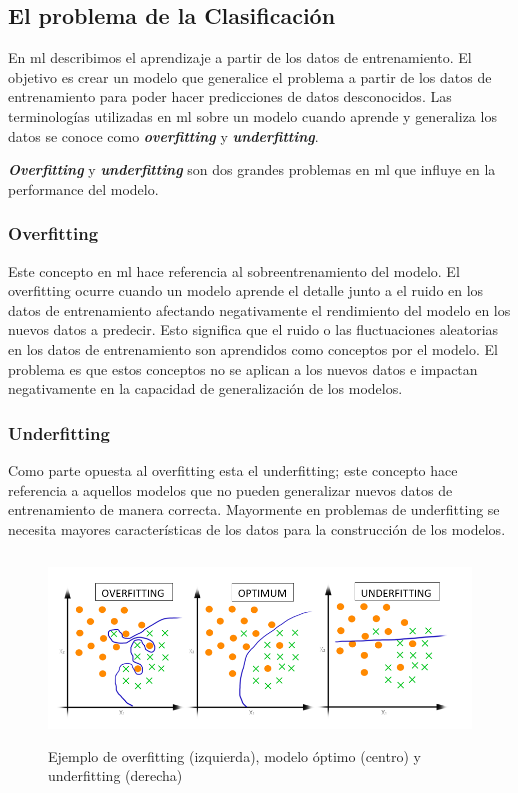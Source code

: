 \subsection{El problema de la Clasificación}\label{sub:malaclasificacion}
En \ac{ml} describimos el aprendizaje a partir de los datos de entrenamiento. El objetivo es crear un modelo que generalice el problema a partir de los datos de entrenamiento para poder hacer predicciones de datos desconocidos. Las terminologías utilizadas en \ac{ml} sobre un modelo cuando aprende y generaliza los datos se conoce como  \textit{\textbf{overfitting}} y \textit{\textbf{underfitting}}.

\textit{\textbf{Overfitting}} y \textit{\textbf{underfitting}} son dos grandes problemas en \ac{ml} que influye en la performance del modelo. 

\subsubsection{Overfitting}
Este concepto en \ac{ml} hace referencia al sobreentrenamiento del modelo. El overfitting ocurre cuando un modelo aprende el detalle junto a el ruido en los datos de entrenamiento afectando negativamente el rendimiento del modelo en los nuevos datos a predecir. Esto significa que el ruido o las fluctuaciones aleatorias en los datos de entrenamiento son aprendidos como conceptos por el modelo. El problema es que estos conceptos no se aplican a los nuevos datos e impactan negativamente en la capacidad de generalización de los modelos.

\subsubsection{Underfitting}
Como parte opuesta al overfitting esta el  underfitting; este concepto hace referencia a aquellos modelos que no pueden generalizar nuevos datos de entrenamiento de manera correcta. Mayormente en problemas de underfitting se necesita mayores características de los datos para la construcción de los modelos.

\begin{figure}[h]
 \centering
  \includegraphics[height=5cm,keepaspectratio=true,clip=true]{imagenes/Logos/OverFUnderF.png}
  \caption{Ejemplo de overfitting (izquierda), modelo óptimo (centro) y underfitting (derecha)}
	\label{Fig: overUnder}
\end{figure}

